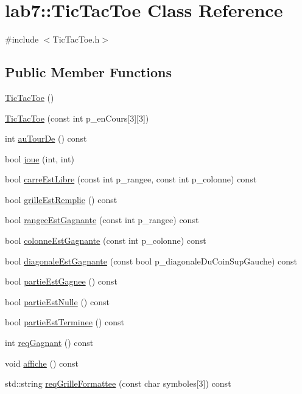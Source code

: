 \hypertarget{classlab7_1_1TicTacToe}{}\section{lab7\+:\+:Tic\+Tac\+Toe Class Reference}
\label{classlab7_1_1TicTacToe}


{\ttfamily \#include $<$Tic\+Tac\+Toe.\+h$>$}

\subsection*{Public Member Functions}
\begin{DoxyCompactItemize}
\item 
\hyperlink{classlab7_1_1TicTacToe_aaaee62ac2cc9f9073795ecb3019764f4}{Tic\+Tac\+Toe} ()
\item 
\hyperlink{classlab7_1_1TicTacToe_a192d59b62d1c9a457362125183747604}{Tic\+Tac\+Toe} (const int p\+\_\+en\+Cours\mbox{[}3\mbox{]}\mbox{[}3\mbox{]})
\item 
int \hyperlink{classlab7_1_1TicTacToe_afb556c0c233a8eb48a67cda693ca8caf}{au\+Tour\+De} () const
\item 
bool \hyperlink{classlab7_1_1TicTacToe_abe77507818b76ed4043de6ffdf1c5675}{joue} (int, int)
\item 
bool \hyperlink{classlab7_1_1TicTacToe_abb76ec869ae10c6ce527759fbadacc25}{carre\+Est\+Libre} (const int p\+\_\+rangee, const int p\+\_\+colonne) const
\item 
bool \hyperlink{classlab7_1_1TicTacToe_a8e72e4ebd69642f050c74f2c41adf734}{grille\+Est\+Remplie} () const
\item 
bool \hyperlink{classlab7_1_1TicTacToe_adc4d6d6c61aac80e4cc26b995ce72a86}{rangee\+Est\+Gagnante} (const int p\+\_\+rangee) const
\item 
bool \hyperlink{classlab7_1_1TicTacToe_a802b609bbe8e0614fe2a6a9234c79899}{colonne\+Est\+Gagnante} (const int p\+\_\+colonne) const
\item 
bool \hyperlink{classlab7_1_1TicTacToe_a422b5f693cf88fb002eb3f87187999a4}{diagonale\+Est\+Gagnante} (const bool p\+\_\+diagonale\+Du\+Coin\+Sup\+Gauche) const
\item 
bool \hyperlink{classlab7_1_1TicTacToe_a2bc802f8841b514aa27932a3202f9e1b}{partie\+Est\+Gagnee} () const
\item 
bool \hyperlink{classlab7_1_1TicTacToe_a278f97c96f7c1e646f16532dd0ac21ae}{partie\+Est\+Nulle} () const
\item 
bool \hyperlink{classlab7_1_1TicTacToe_a3480fd52c83f0c3631a5686ea5e51d4e}{partie\+Est\+Terminee} () const
\item 
int \hyperlink{classlab7_1_1TicTacToe_a6b79c847e3f8088602e869fd88cf4479}{req\+Gagnant} () const
\item 
void \hyperlink{classlab7_1_1TicTacToe_a09cc7980d7f465b21880971e5bccf178}{affiche} () const
\item 
std\+::string \hyperlink{classlab7_1_1TicTacToe_ad014f5c637baa564c99d4ddb0e744f8e}{req\+Grille\+Formattee} (const char symboles\mbox{[}3\mbox{]}) const
\end{DoxyCompactItemize}


